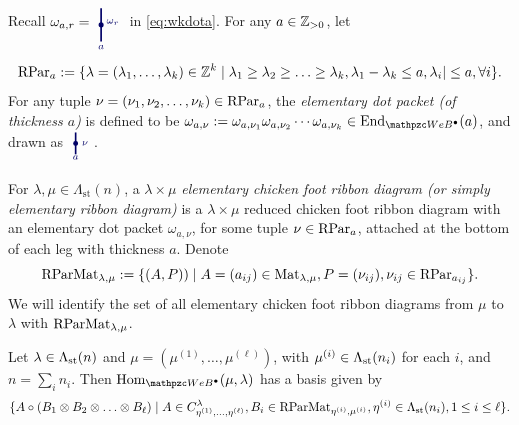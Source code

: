 Recall $\omega_{a,r}=
\begin{tikzpicture}[baseline = -1mm,scale=.7,color=\clr]
\draw[-,line width=1.2pt] (0.08,-.7) to (0.08,.5);
\node at (.08,-.9) {$\scriptstyle a$};
\draw(0.08,-0.1) \bdot;
\draw(.5,0)node {$\scriptstyle \omega_r$};
\end{tikzpicture}$ in \eqref{eq:wkdota}. For any $a\in \mathbb{Z}_{>0}$, let
    \begin{equation}
    \label{eq:RPar}
          \text{RPar}_a:=\{\lambda=(\lambda_1,\ldots,\lambda_k)\in \mathbb{Z}^k\mid \lambda_1\ge \lambda_2\ge \ldots\ge \lambda_k, \lambda_1-\lambda_k\le a, \lambda_i|\le a, \forall i\}.
    \end{equation}
    For any tuple $\nu=(\nu_1,\nu_2,\ldots, \nu_k)\in \text{RPar}_a$, the {\em elementary dot packet (of thickness $a$)} is defined to be 
$\omega_{a, \nu}:= \omega_{a,\nu_1}\omega_{a,\nu_2}\cdots \omega_{a,\nu_k}\in \End_{\qAW}(a)$, and 
drawn as $
\begin{tikzpicture}[baseline = 3pt, scale=0.4, color=\clr]
\draw[-,line width=1.2pt] (0,-.2) to[out=up, in=down] (0,1.2);
\draw(0,0.5) \bdot; \node at (0.6,0.5) {$ \scriptstyle \nu$};
\node at (0,-.4) {$\scriptstyle a$};
\end{tikzpicture}$.

For $\lambda,\mu\in \Lambda_{\text{st}}(n)$, a $\lambda\times \mu$ {\em elementary chicken foot ribbon diagram (or simply elementary ribbon diagram)} is a $\lambda\times \mu$ reduced chicken foot ribbon diagram with an elementary dot packet $\omega_{a,\nu}$, for some tuple $\nu\in \text{RPar}_a$, attached at the bottom of each leg with thickness $a$. 
Denote  
\begin{equation}\label{dottedreduced}
 \text{RParMat}_{\lambda,\mu}:=\{ (A, P))\mid  A=(a_{ij})\in \text{Mat}_{\lambda,\mu}, P=(\nu_{ij}), \nu_{ij}\in \text{RPar}_{a_{ij}} \}.   
\end{equation}
We will identify the set of all elementary chicken foot ribbon diagrams from $\mu$ to $\lambda$ with $\text{RParMat}_{\lambda,\mu}$.

\begin{lemma}
\label{lem:basisofmorphism}
  Let $\lambda\in \Lambda_{\text{st}}(n)$ and $\mu= (\mu^{(1)}, \ldots, \mu^{(\ell)})$, with $\mu^{(i)}\in \Lambda_{\text{st}}(n_i)$ for each $i$, and $n=\sum_in_i$. Then 
  $\Hom_{\qAW}(\mu,\lambda)$ has a basis given by 
  \[
  \{A \circ (B_1\otimes B_2\otimes \ldots \otimes B_\ell) \mid A\in C_{\eta^{(1)},\ldots,\eta^{(\ell)}}^\lambda, B_i \in \text{RParMat}_{\eta^{(i)},\mu^{(i)}}, \eta^{(i)}\in \Lambda_{\text{st}}(n_i), 1\le i\le \ell \}. 
  \]
\end{lemma}

